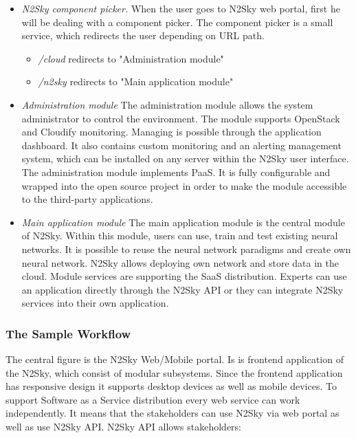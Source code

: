 \begin{itemize}
\item \emph{N2Sky component picker.} When the user goes to N2Sky web portal, first he will be dealing with a component picker. The component picker is a small service, which redirects the user depending on URL path.
\begin{itemize}
\item \emph{/cloud} redirects to "Administration module"
\item \emph{/n2sky} redirects to "Main application module"
\end{itemize}


\item \emph{Administration module} The administration module allows the system administrator to control the environment. The module supports OpenStack and Cloudify monitoring. Managing is possible through the application dashboard. It also contains custom monitoring and an alerting management system, which can be installed on any server within the N2Sky user interface. The administration module implements PaaS. It is fully configurable and wrapped into the open source project in order to make the module accessible to the third-party applications. 
\item \emph{Main application module} The main application module is the central module of N2Sky. Within this module, users can use, train and test existing neural networks. It is possible to reuse the neural network paradigms and create own neural network. N2Sky allows deploying own network and store data in the cloud. Module services are supporting the SaaS distribution. Experts can use an application directly through the N2Sky API or they can integrate N2Sky services into their own application. 
\end{itemize}


\subsubsection{The Sample Workflow}


The central figure is the N2Sky Web/Mobile portal. Is is frontend application of the N2Sky, which consist of modular subsystems. Since the frontend application has responsive design it supports desktop devices as well as mobile devices. 
To support Software as a Service distribution every web service can work independently. It means that the stakeholders can use N2Sky via web portal as well as use N2Sky API.
N2Sky API allows  stakeholders:

